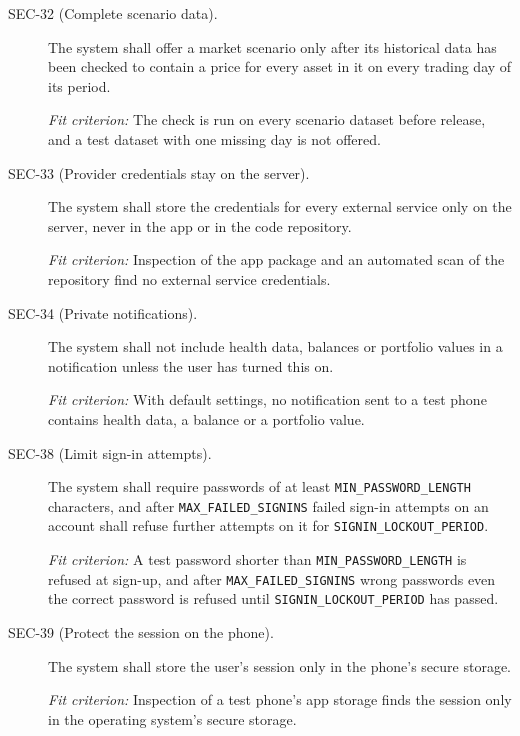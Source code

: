 \documentclass[12pt]{article}
\begin{document}
\begin{description}
\item[SEC-32 (Complete scenario data).] The system shall offer a market scenario only after its historical data has
been checked to contain a price for every asset in it on every trading day of
its period.

\textit{Fit criterion:} The check is run on every scenario dataset before
release, and a test dataset with one missing day is not offered.

\item[SEC-33 (Provider credentials stay on the server).] The system shall store the credentials for every external service only on the
server, never in the app or in the code repository.

\textit{Fit criterion:} Inspection of the app package and an automated scan of
the repository find no external service credentials.

\item[SEC-34 (Private notifications).] The system shall not include health data, balances or portfolio values in a
notification unless the user has turned this on.

\textit{Fit criterion:} With default settings, no notification sent to a test
phone contains health data, a balance or a portfolio value.

\item[SEC-38 (Limit sign-in attempts).] The system shall require passwords of at least \texttt{MIN\_PASSWORD\_LENGTH}
characters, and after \texttt{MAX\_FAILED\_SIGNINS} failed sign-in attempts on
an account shall refuse further attempts on it for
\texttt{SIGNIN\_LOCKOUT\_PERIOD}.

\textit{Fit criterion:} A test password shorter than
\texttt{MIN\_PASSWORD\_LENGTH} is refused at sign-up, and after
\texttt{MAX\_FAILED\_SIGNINS} wrong passwords even the correct password is
refused until \texttt{SIGNIN\_LOCKOUT\_PERIOD} has passed.

\item[SEC-39 (Protect the session on the phone).] The system shall store the user's session only in the phone's secure storage.

\textit{Fit criterion:} Inspection of a test phone's app storage finds the
session only in the operating system's secure storage.

\end{description}
\end{document}
